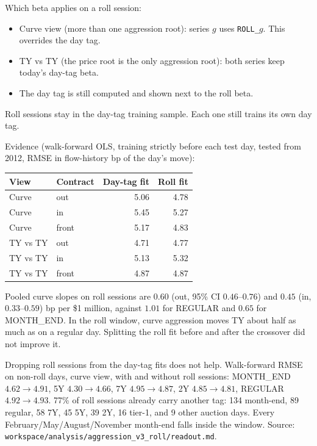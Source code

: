 \documentclass[11pt]{article}
\begin{document}
Which beta applies on a roll session:
\begin{itemize}
    \item Curve view (more than one aggression root): series $g$ uses \texttt{ROLL\_}$g$. This overrides the day tag.
    \item TY vs TY (the price root is the only aggression root): both series keep today's day-tag beta.
    \item The day tag is still computed and shown next to the roll beta.
\end{itemize}

Roll sessions stay in the day-tag training sample. Each one still trains its own day tag.

Evidence (walk-forward OLS, training strictly before each test day, tested from 2012, RMSE in flow-history bp of the day's move):
\begin{center}
\begin{tabular}{@{}llrr@{}}
\toprule
\textbf{View} & \textbf{Contract} & \textbf{Day-tag fit} & \textbf{Roll fit} \\
\midrule
Curve & out & 5.06 & 4.78 \\
Curve & in & 5.45 & 5.27 \\
Curve & front & 5.17 & 4.83 \\
TY vs TY & out & 4.71 & 4.77 \\
TY vs TY & in & 5.13 & 5.32 \\
TY vs TY & front & 4.87 & 4.87 \\
\bottomrule
\end{tabular}
\end{center}
Pooled curve slopes on roll sessions are $0.60$ (out, 95\% CI $0.46$--$0.76$) and $0.45$ (in, $0.33$--$0.59$) bp per \$1 million, against $1.01$ for REGULAR and $0.65$ for MONTH\_END. In the roll window, curve aggression moves TY about half as much as on a regular day. Splitting the roll fit before and after the crossover did not improve it.

Dropping roll sessions from the day-tag fits does not help. Walk-forward RMSE on non-roll days, curve view, with and without roll sessions: MONTH\_END $4.62\to4.91$, 5Y $4.30\to4.66$, 7Y $4.95\to4.87$, 2Y $4.85\to4.81$, REGULAR $4.92\to4.93$. 77\% of roll sessions already carry another tag: 134 month-end, 89 regular, 58 7Y, 45 5Y, 39 2Y, 16 tier-1, and 9 other auction days. Every February/May/August/November month-end falls inside the window. Source: \texttt{workspace/analysis/aggression\_v3\_roll/readout.md}.
\end{document}
